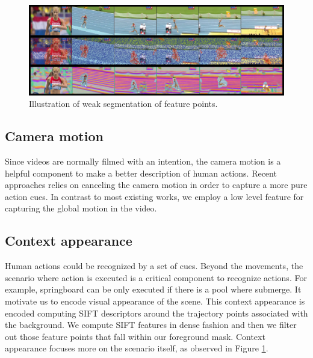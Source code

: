 \begin{figure}[t!]
\begin{center}
\includegraphics[width=0.98\linewidth]{fig/approach.png}
\end{center}
\caption{Illustration of weak segmentation of feature points. }
\label{fig:approach}
\end{figure}

\subsection{Camera motion}
Since videos are normally filmed with an intention, the camera motion is a helpful component to make a better description of human actions. Recent approaches relies on canceling the camera motion in order to capture a more pure action cues. In contrast to most existing works, we employ a low level feature for capturing the global motion in the video. 
\subsection{Context appearance}
Human actions could be recognized by a set of cues. Beyond the movements, the scenario where action is executed is a critical component to recognize actions. For example, springboard can be only executed if there is a pool where submerge. It motivate us to encode visual appearance of the scene. This context appearance is encoded computing SIFT \cite{lowe2004} descriptors around the trajectory points associated with the background. We compute SIFT features in dense fashion and then we filter out those feature points that fall within our foreground mask. Context appearance focuses more on the scenario itself, as observed in Figure \ref{fig:approach}. 
